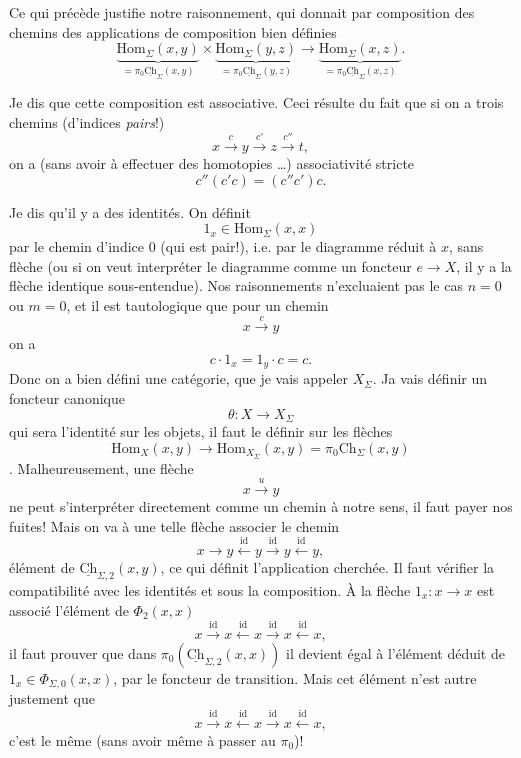 \documentclass[11pt]{article}
\newcommand{\printedpage}[1]{\marginpar{\footnotesize p.~#1}}
\newcommand{\msp}[1]{\marginpar{\footnotesize [#1]}}
\newcommand{\uCh}{\underline{\mathrm{Ch}}}
\newcommand{\Hom}{\mathrm{Hom}}
\begin{document}
\printedpage{14}
Ce qui précède justifie notre raisonnement, qui donnait par composition des chemins des applications de composition bien définies
\[
\underbrace{\Hom_\Sigma(x,y)}_{=\pi_0\uCh_\Sigma(x,y)} \times \underbrace{\Hom_\Sigma(y,z)}_{=\pi_0\uCh_\Sigma(y,z)} \longrightarrow \underbrace{\Hom_\Sigma(x,z)}_{=\pi_0\underline{\textstyle\mathrm{Ch}}_\Sigma(x,z)}.
\]

\msp{page 22}Je dis que cette composition est associative. Ceci résulte du fait que si on a trois chemins (d'indices \textit{pairs}!)
\[
x \xrightarrow{c} y \xrightarrow{c'} z \xrightarrow{c''} t,
\]
on a (sans avoir à effectuer des homotopies \dots) associativité stricte
\[
c''(c'c) = (c''c')c.
\]

Je dis qu'il y a des identités. On définit
\[
1_x \in \Hom_\Sigma(x,x)
\]
par le chemin d'indice 0 (qui est pair!), i.e. par le diagramme réduit à $x$, sans flèche (ou si on veut interpréter le diagramme comme un foncteur $e \longrightarrow X$, il y a la flèche identique sous-entendue). Nos raisonnements n'excluaient pas le cas $n = 0$ ou $m = 0$, et il est tautologique que pour un chemin
\[
x \xrightarrow{c} y
\]
on a
\[
c \cdot 1_x = 1_y \cdot c = c.
\]
Donc on a bien défini une catégorie, que je vais appeler $X_\Sigma$. Ja vais définir un foncteur canonique %
\[
\theta : X \longrightarrow X_\Sigma
\]
qui sera l'identité sur les objets, il faut le définir sur les flèches
\[
\Hom_X(x,y) \longrightarrow \Hom_{X_\Sigma}(x,y) = \pi_0\mathrm{Ch}_\Sigma(x,y)
\]
. Malheureusement, une flèche
\[
x \xrightarrow{u} y
\]
\msp{page 23}ne peut s'interpréter directement comme un chemin à notre sens, il faut payer nos fuites! Mais on va à une telle flèche associer le chemin
\[
x \longrightarrow y \xleftarrow{\mathrm{id}} y \xrightarrow{\mathrm{id}} y \xleftarrow{\mathrm{id}} y,
\]
\printedpage{15}
élément de $\uCh_{\Sigma,2}(x,y)$, ce qui définit l'application cherchée. Il faut vérifier la compatibilité avec les identités et sous la composition. À la flèche $1_x : x \longrightarrow x$ est associé l'élément de $\Phi_2(x,x)$
\[
x \xrightarrow{\mathrm{id}} x \xleftarrow{\mathrm{id}} x \xrightarrow{\mathrm{id}} x \xleftarrow{\mathrm{id}} x,
\]
il faut prouver que dans $\pi_0(\uCh_{\Sigma,2}(x,x))$ il devient égal à l'élément déduit de $1_x \in \Phi_{\Sigma,0}(x,x)$, par le foncteur de transition. Mais cet élément n'est autre justement que
\[
x \xrightarrow{\mathrm{id}} x \xleftarrow{\mathrm{id}} x \xrightarrow{\mathrm{id}} x \xleftarrow{\mathrm{id}} x,
\]
c'est le même (sans avoir même à passer au $\pi_0$)!
\end{document}
